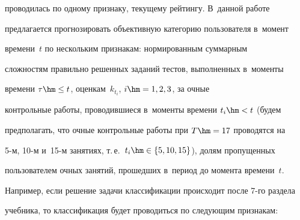 проводилась по одному признаку, текущему рейтингу. В~данной работе 


предлагается прогнозировать объективную категорию пользователя в~момент 


времени~$t$ по нескольким признакам: нормированным суммарным 


сложностям правильно решенных заданий тестов, выполненных в~моменты 


времени $\tau\hm\leq t$, оценкам~$k_{t_i}$, $i\hm=1,2,3$, за очные 


контрольные работы, проводившиеся в~моменты времени $t_i\hm< t$ (будем 


предполагать, что очные контрольные работы при $T\hm= 17$ проводятся на  


5-м, 10-м и~15-м занятиях, т.\,е.\ $t_i\hm \in \{5,10,15\}$), долям пропущенных 


пользователем очных занятий, прошедших в~период до момента времени~$t$. 


Например, если решение задачи классификации происходит после 7-го раздела 


учебника, то классификация будет проводиться по следующим признакам: 


